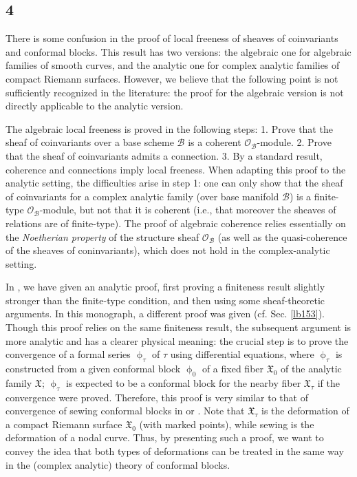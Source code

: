\documentclass[12pt,a4paper,notitlepage]{article}
\theoremstyle{definition}
\theoremstyle{plain}
\newcommand{\fk}{\mathfrak}
\newcommand{\mc}{\mathcal}
\newcommand{\scr}{\mathscr}
\numberwithin{equation}{section}
\begin{document}
\subsection*{4}

There is some confusion in the proof of local freeness of sheaves of coinvariants and conformal blocks. This result has two versions: the algebraic one for algebraic families of smooth curves, and the analytic one for complex analytic families of compact Riemann surfaces. However, we believe that the following point is not sufficiently recognized in the literature: the proof for the algebraic version is not directly applicable to the analytic version.

The algebraic local freeness is proved in the following steps: 1. Prove that the sheaf of coinvariants over a base scheme $\mc B$ is a coherent $\scr O_{\mc B}$-module. 2. Prove that the sheaf of coinvariants admits a connection. 3. By a standard result, coherence and connections imply local freeness. When adapting this proof to the analytic setting, the difficulties arise in step 1: one can only show that the sheaf of coinvariants for a complex analytic family (over base manifold $\mc B$) is a finite-type $\scr O_{\mc B}$-module, but not that it is coherent (i.e., that moreover the sheaves of relations are of finite-type). The proof of algebraic coherence relies essentially on the \emph{Noetherian property} of the structure sheaf $\scr O_{\mc B}$ (as well as the quasi-coherence of the sheaves of coninvariants), which does not hold in the complex-analytic setting. 

In \cite{Gui}, we have given an analytic proof, first proving a finiteness result slightly stronger than the finite-type condition, and then using some sheaf-theoretic arguments. In this monograph, a different proof was given (cf. Sec. \ref{lb153}). Though this proof  relies on the same finiteness result, the subsequent argument is more analytic and has a clearer physical meaning: the crucial step is to prove the convergence of a formal series $\upphi_\tau$ of $\tau$ using differential equations, where $\upphi_\tau$ is constructed from a given conformal block $\upphi_0$ of a fixed fiber $\fk X_0$ of the analytic family $\fk X$; $\upphi_\tau$ is expected to be a conformal block for the nearby fiber $\fk X_\tau$ if the convergence were proved. Therefore, this proof is very similar to that of convergence of sewing conformal blocks in \cite{Gui} or \cite{Gui20}. Note that $\fk X_\tau$ is the deformation of a compact Riemann surface $\fk X_0$ (with marked points), while sewing is the deformation of a nodal curve. Thus, by presenting such a proof, we want to convey the idea that both types of deformations can be treated in the same way in the (complex analytic) theory of conformal blocks.
\end{document}
